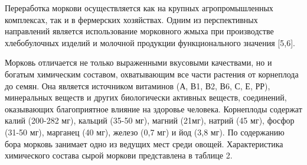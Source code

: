 
Переработка моркови осуществляется как на крупных агропромышленных
комплексах, так и в фермерских хозяйствах. Одним из перспективных
направлений является использование морковного жмыха при производстве
хлебобулочных изделий и молочной продукции функционального значения
{[}5,6{]}.

Морковь отличается не только выраженными вкусовыми качествами, но и
богатым химическим составом, охватывающим все части растения от
корнеплода до семян. Она является источником витаминов (А, В1, В2, В6,
С, Е, РР), минеральных веществ и других биологически активных веществ,
соединений, оказывающих благоприятное влияние на здоровье человека.
Корнеплоды содержат калий (200-282 мг), кальций (35-50 мг), магний
(21мг), натрий (45 мг), фосфор (31-50 мг), марганец (40 мг), железо (0,7
мг) и йод (3,8 мг). По содержанию бора морковь занимает одно из ведущих
мест среди овощей. Характеристика химического состава сырой моркови
представлена в таблице 2.

